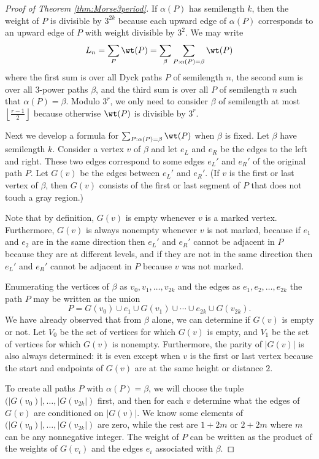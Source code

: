 \begin{proof}[Proof of Theorem \ref{thm:Morse3period}]
    If $\alpha(P)$ has semilength $k$, then the weight of $P$ is divisible by $3^{2k}$ because each upward edge of $\alpha(P)$ corresponds to an upward edge of $P$ with weight divisible by $3^2$. We may write
    \[L_n=\sum_{P}\wt(P)=\sum_{\beta}\sum_{P: \alpha(P)=\beta}\wt(P)\]
    where the first sum is over all Dyck paths $P$ of semilength $n$, the second sum is over all $3$-power paths $\beta$, and the third sum is over all $P$ of semilength $n$ such that $\alpha(P)=\beta$. Modulo $3^r$, we only need to consider $\beta$ of semilength at most $\left\lfloor\frac{r-1}{2}\right\rfloor$ because otherwise $\wt(P)$ is divisible by $3^r$.
    
    Next we develop a formula for $\sum_{P: \alpha(P)=\beta}\wt(P)$ when $\beta$ is fixed. Let $\beta$ have semilength $k$. Consider a vertex $v$ of $\beta$ and let $e_L$ and $e_R$ be the edges to the left and right. These two edges correspond to some edges $e_L'$ and $e_R'$ of the original path $P$. Let $G(v)$ be the edges between $e_L'$ and $e_R'$. (If $v$ is the first or last vertex of $\beta$, then $G(v)$ consists of the first or last segment of $P$ that does not touch a gray region.)
    
    Note that by definition, $G(v)$ is empty whenever $v$ is a marked vertex. Furthermore, $G(v)$ is always nonempty whenever $v$ is not marked, because if $e_1$ and $e_2$ are in the same direction then $e_L'$ and $e_R'$ cannot be adjacent in $P$ because they are at different levels, and if they are not in the same direction then $e_L'$ and $e_R'$ cannot be adjacent in $P$ because $v$ was not marked.
    
    Enumerating the vertices of $\beta$ as $v_0, v_1, \dotsc, v_{2k}$ and the edges as $e_1, e_2, \dotsc, e_{2k}$ the path $P$ may be written as the union \[P=G(v_0)\cup e_1 \cup G(v_1)\cup \dotsb \cup e_{2k}\cup G(v_{2k}).\]
    We have already observed that from $\beta$ alone, we can determine if $G(v)$ is empty or not. Let $V_{0}$ be the set of vertices for which $G(v)$ is empty, and $V_1$ be the set of vertices for which $G(v)$ is nonempty. Furthermore, the parity of $\lvert G(v)\rvert$ is also always determined: it is even except when $v$ is the first or last vertex because the start and endpoints of $G(v)$ are at the same height or distance $2$.
    
    To create all paths $P$ with $\alpha(P)=\beta$, we will choose the tuple $(\lvert G(v_0)\rvert, \dotsc, \lvert G(v_{2k}\rvert)$ first, and then for each $v$ determine what the edges of $G(v)$ are conditioned on $\lvert G(v)\rvert$. We know some elements of $(\lvert G(v_0)\rvert, \dotsc, \lvert G(v_{2k}\rvert)$ are zero, while the rest are $1+2m$ or $2+2m$ where $m$ can be any nonnegative integer. The weight of $P$ can be written as the product of the weights of $G(v_i)$ and the edges $e_i$ associated with $\beta$.
    

\end{proof}
